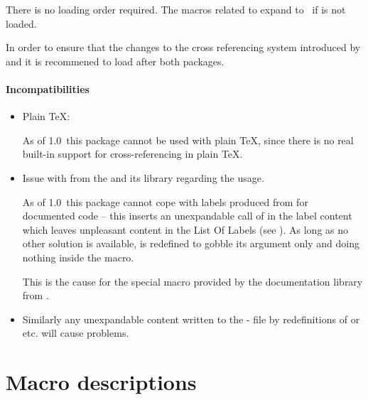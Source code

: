 \documentclass[12pt,a4paper,oneside]{article}
\def\packageversion{1.0}
\newcommand{\PackageDocName}{crossreftools}%
\begin{document}
There is no loading order required. The macros related to  expand to \makeatletter\fbox{\crt@refundefined}\makeatother\ if  is not loaded. 

\begin{marker}
  In order to ensure that the changes to the cross referencing system introduced by  and  it is recommened to load \CHDocPackage{\PackageDocName} after both packages. 
\end{marker}

\subsection{Incompatibilities}\label{subsection:incompatibilities}

\begin{itemize}
  \item Plain \TeX:

    
As of \packageversion\ this package cannot be used with plain \TeX, since there is no real built-in support for cross-referencing in plain \TeX. 
\item Issue with  from the  and its  library regarding the  usage. 

  As of \packageversion\ this package cannot cope with labels produced from  for documented code -- this inserts an unexpandable call of  in the label content which leaves unpleasant content in the List Of Labels (see ). As long as no other solution is available,  is redefined to gobble its argument only and doing nothing inside the  macro. 

\begin{marker}
  This is the cause for the special  macro provided by the documentation library from .
\end{marker}
  
\item Similarly any unexpandable content written to the  - file by redefinitions of  or  etc. will cause problems. 
\end{itemize}

\clearpage

\part{Macro descriptions}
\end{document}
